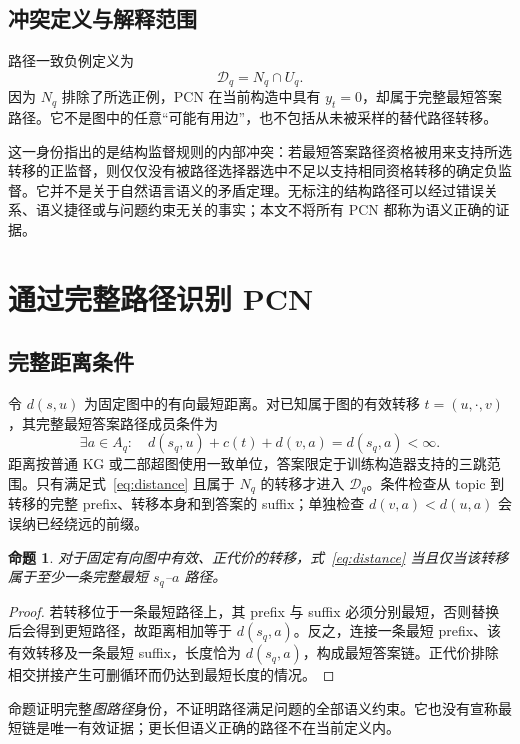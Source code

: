 \documentclass[UTF8,a4paper,10pt,fontset=fandol]{ctexart}
\newtheorem{proposition}{命题}
\newcommand{\pcn}{\mathcal D_q}
\begin{document}
\subsection{冲突定义与解释范围}
路径一致负例定义为
\begin{equation}
\pcn=N_q\cap U_q.
\label{eq:pcn}
\end{equation}
因为 $N_q$ 排除了所选正例，PCN 在当前构造中具有 $y_t=0$，却属于完整最短答案路径。它不是图中的任意“可能有用边”，也不包括从未被采样的替代路径转移。

这一身份指出的是结构监督规则的内部冲突：若最短答案路径资格被用来支持所选转移的正监督，则仅仅没有被路径选择器选中不足以支持相同资格转移的确定负监督。它并不是关于自然语言语义的矛盾定理。无标注的结构路径可以经过错误关系、语义捷径或与问题约束无关的事实；本文不将所有 PCN 都称为语义正确的证据。

\section{通过完整路径识别 PCN}
\subsection{完整距离条件}
令 $d(s,u)$ 为固定图中的有向最短距离。对已知属于图的有效转移 $t=(u,\cdot,v)$，其完整最短答案路径成员条件为
\begin{equation}
\exists a\in A_q:\quad d(s_q,u)+c(t)+d(v,a)=d(s_q,a)<\infty.
\label{eq:distance}
\end{equation}
距离按普通 KG 或二部超图使用一致单位，答案限定于训练构造器支持的三跳范围。只有满足式~\eqref{eq:distance} 且属于 $N_q$ 的转移才进入 $\pcn$。条件检查从 topic 到转移的完整 prefix、转移本身和到答案的 suffix；单独检查 $d(v,a)<d(u,a)$ 会误纳已经绕远的前缀。

\begin{proposition}
对于固定有向图中有效、正代价的转移，式~\eqref{eq:distance} 当且仅当该转移属于至少一条完整最短 $s_q$--$a$ 路径。
\end{proposition}
\begin{proof}
若转移位于一条最短路径上，其 prefix 与 suffix 必须分别最短，否则替换后会得到更短路径，故距离相加等于 $d(s_q,a)$。反之，连接一条最短 prefix、该有效转移及一条最短 suffix，长度恰为 $d(s_q,a)$，构成最短答案链。正代价排除相交拼接产生可删循环而仍达到最短长度的情况。
\end{proof}

命题证明完整\emph{图路径}身份，不证明路径满足问题的全部语义约束。它也没有宣称最短链是唯一有效证据；更长但语义正确的路径不在当前定义内。
\end{document}
